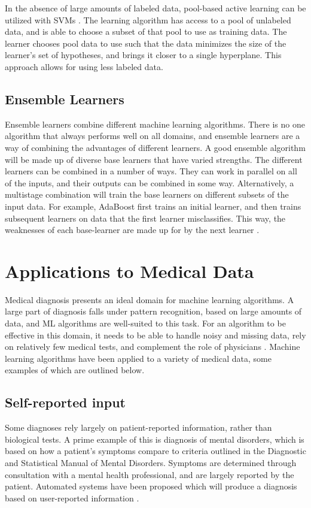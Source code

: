 \documentclass[draftcopy]{srpaper}
\begin{document}
In the absence of large amounts of labeled data, pool-based active
learning can be utilized with SVMs \cite{TK01}. The learning
algorithm has access to a pool of unlabeled data, and is able to
choose a subset of that pool to use as training data. The learner
chooses pool data to use such that the data minimizes the size of
the learner's set of hypotheses,
and brings it closer to a single hyperplane. This approach allows for
using less labeled data.

\subsection{Ensemble Learners}
Ensemble learners combine different machine learning algorithms. There
is no one algorithm that always performs well on all domains, and
ensemble learners are a way of combining the advantages of different
learners. A good ensemble algorithm will be made up of diverse base
learners that have varied strengths. The different learners can be
combined in a number of ways. They can work in parallel on all of the inputs, and their
outputs can be combined in some way. Alternatively, a multistage combination will train the base
learners on different subsets of the input data. For example, AdaBoost
first trains an
initial learner, and then trains subsequent learners on data that the
first learner misclassifies. This way, the weaknesses of each
base-learner are made up for by the next learner \cite{FS95}.

\section{Applications to Medical Data}
Medical diagnosis presents an ideal domain for machine learning
algorithms. A large part of diagnosis falls under pattern recognition,
based on large amounts of data, and ML algorithms are well-suited to
this task. For an algorithm to be effective in this domain, it needs to be able to handle noisy and missing
data, rely on relatively few medical tests, and complement the role of
physicians \cite{Kon01}.
Machine learning algorithms have been applied to a variety of medical
data, some examples of which are outlined below.

\subsection{Self-reported input}
Some diagnoses rely largely on patient-reported information, rather than
biological tests. A prime example of this is diagnosis of mental disorders,
which is based on how a patient's symptoms compare to criteria
outlined in the Diagnostic and Statistical Manual of Mental
Disorders. Symptoms are determined through consultation with a mental
health professional, and are largely reported by the
patient. Automated systems
have been proposed which will produce a diagnosis based on
user-reported information \cite{yap1996}.
\end{document}
